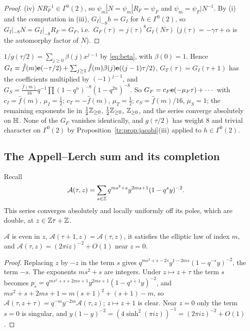 \begin{proof}
(iv) $NR_F^{-1}\in\Gamma^0(2)$, so $\psi_m|N=\psi_m|R_F=\psi_F$ and $\psi_m=\psi_F|N^{-1}$. By (i) and the computation in (iii), $G_I|_{-8}h=G_I$ for $h\in\Gamma^0(2)$, so $G_I|_{-8}N=G_I|_{-8}R_F=G_F$, i.e.\ $G_F(\tau)=j(\tau)^8G_I(N\tau)$ ($j(\tau)=-\gamma\tau+\alpha$ is the automorphy factor of $N$).
\end{proof}

\begin{remark}\label{tr:rem:G}
$1/g(\tau/2)=\sum_{j\ge0}\beta(j)x^{j-1}$ by \eqref{eq:beta}, with $\beta(0)=1$. Hence $G_I=\hat f(m)\mathbf e(-\tau/2)+\sum_{j\ge1}\hat f(m)\beta(j)\mathbf e((j-1)\tau/2)$, $G_T(\tau)=G_I(\tau+1)$ has the coefficients multiplied by $(-1)^{j-1}$, and $G_S=\frac{\hat f(m)}{16}q^{-1}\prod(1-q^n)^{-8}(1-q^{2n})^{-8}$. So $G_F=c_F\mathbf e(-\mu_F\tau)+\cdots$ with $c_I=\hat f(m)$, $\mu_I=\frac12$; $c_T=-\hat f(m)$, $\mu_T=\frac12$; $c_S=\hat f(m)/16$, $\mu_S=1$; the remaining exponents lie in $\frac12\mathbb{Z}_{\ge0}$, $\frac12\mathbb{Z}_{\ge0}$, $\mathbb{Z}_{\ge0}$, and the series converge absolutely on $\mathbb{H}$. None of the $G_F$ vanishes identically, and $g(\tau/2)$ has weight $8$ and trivial character on $\Gamma^0(2)$ by Proposition~\ref{tr:prop:jacobi}(iii) applied to $h\in\Gamma^0(2)$.
\end{remark}

\subsection{The Appell--Lerch sum and its completion}\label{tr:appell}
Recall
\[
\mathcal A(\tau,z)=\sum_{s\in\mathbb{Z}}q^{ms^2+s}y^{2ms+1}(1-q^sy)^{-2}.
\]
This series converges absolutely and locally uniformly off its poles, which are double, at $z\in\mathbb{Z}\tau+\mathbb{Z}$.

\begin{lemma}\label{tr:lem:Aprops}
$\mathcal A$ is even in $z$, $\mathcal A(\tau+1,z)=\mathcal A(\tau,z)$, it satisfies the elliptic law of index $m$, and $\mathcal A(\tau,z)=(2\pi iz)^{-2}+O(1)$ near $z=0$.
\end{lemma}

\begin{proof}
Replacing $z$ by $-z$ in the term $s$ gives $q^{ms^2+s-2s}y^{1-2ms}(1-q^{-s}y)^{-2}$, the term $-s$. The exponents $ms^2+s$ are integers. Under $z\mapsto z+\tau$ the term $s$ becomes $p_s=q^{ms^2+s+2ms+1}y^{2ms+1}(1-q^{s+1}y)^{-2}$, and $ms^2+s+2ms+1=m(s+1)^2+(s+1)-m$, so $\mathcal A(\tau,z+\tau)=q^{-m}y^{-2m}\mathcal A(\tau,z)$; $z\mapsto z+1$ is clear. Near $z=0$ only the term $s=0$ is singular, and $y(1-y)^{-2}=(4\sinh^2(\pi iz))^{-1}=(2\pi iz)^{-2}+O(1)$.
\end{proof}

